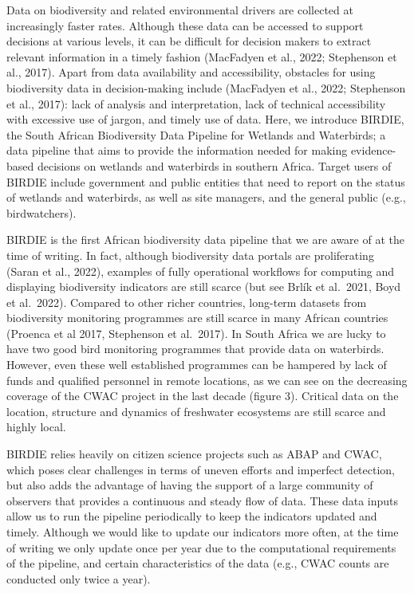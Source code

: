 \documentclass[utf8]{frontiersSCNS}
\begin{document}
Data on biodiversity and related environmental drivers are collected at
increasingly faster rates. Although these data can be accessed to
support decisions at various levels, it can be difficult for decision
makers to extract relevant information in a timely fashion (MacFadyen et
al., 2022; Stephenson et al., 2017). Apart from data availability and
accessibility, obstacles for using biodiversity data in decision-making
include (MacFadyen et al., 2022; Stephenson et al., 2017): lack of
analysis and interpretation, lack of technical accessibility with
excessive use of jargon, and timely use of data. Here, we introduce
BIRDIE, the South African Biodiversity Data Pipeline for Wetlands and
Waterbirds; a data pipeline that aims to provide the information needed
for making evidence-based decisions on wetlands and waterbirds in
southern Africa. Target users of BIRDIE include government and public
entities that need to report on the status of wetlands and waterbirds,
as well as site managers, and the general public (e.g., birdwatchers).

BIRDIE is the first African biodiversity data pipeline that we are aware
of at the time of writing. In fact, although biodiversity data portals
are proliferating (Saran et al., 2022), examples of fully operational
workflows for computing and displaying biodiversity indicators are still
scarce (but see Brlík et al.~2021, Boyd et al.~2022). Compared to other
richer countries, long-term datasets from biodiversity monitoring
programmes are still scarce in many African countries (Proenca et al
2017, Stephenson et al.~2017). In South Africa we are lucky to have two
good bird monitoring programmes that provide data on waterbirds.
However, even these well established programmes can be hampered by lack
of funds and qualified personnel in remote locations, as we can see on
the decreasing coverage of the CWAC project in the last decade (figure
3). Critical data on the location, structure and dynamics of freshwater
ecosystems are still scarce and highly local.

BIRDIE relies heavily on citizen science projects such as ABAP and CWAC,
which poses clear challenges in terms of uneven efforts and imperfect
detection, but also adds the advantage of having the support of a large
community of observers that provides a continuous and steady flow of
data. These data inputs allow us to run the pipeline periodically to
keep the indicators updated and timely. Although we would like to update
our indicators more often, at the time of writing we only update once
per year due to the computational requirements of the pipeline, and
certain characteristics of the data (e.g., CWAC counts are conducted
only twice a year).
\end{document}
